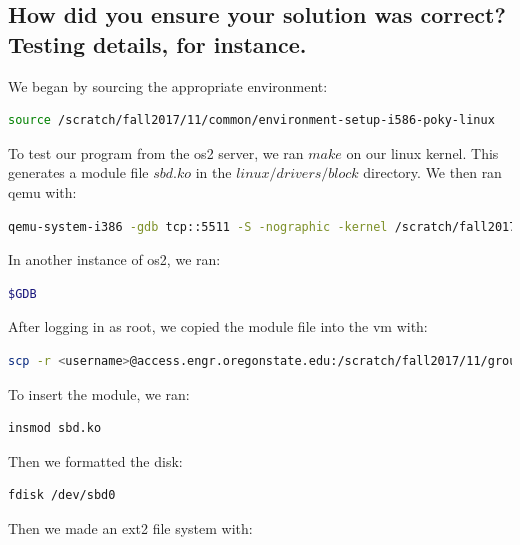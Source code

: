 \documentclass[letterpaper, onecolumn, draftclsnofoot, 10pt, compsoc]{IEEEtran}
\begin{document}
    \subsection{How did you ensure your solution was correct? Testing details, for instance.}
        \begin{singlespace}
        We began by sourcing the appropriate environment:
        
        \begin{lstlisting}[language=bash]
source /scratch/fall2017/11/common/environment-setup-i586-poky-linux
        \end{lstlisting}
        
        To test our program from the os2 server, we ran $make$ on our linux kernel. 
        This generates a module file $sbd.ko$ in the $linux/drivers/block$ directory. We then ran qemu with:
        \begin{lstlisting}[language=bash]
qemu-system-i386 -gdb tcp::5511 -S -nographic -kernel /scratch/fall2017/11/group11repo/linux/arch/x86/boot/bzImage -drive file=/scratch/fall2017/11/common/core-image-lsb-sdk-qemux86.ext4,if=virtio -enable-kvm -usb -localtime --no-reboot --append "root=/dev/vda rw console=ttyS0 debug"
        \end{lstlisting}
        In another instance of os2, we ran:
        \begin{lstlisting}[language=bash]
$GDB
        \end{lstlisting}
    
        After logging in as root, we copied the module file into the vm with:
        
        \begin{lstlisting}[language=bash]
scp -r <username>@access.engr.oregonstate.edu:/scratch/fall2017/11/group11repo/linux/drivers/block/sbd.ko .
        \end{lstlisting}
         
        To insert the module, we ran:
        
        \begin{lstlisting}[language=bash]
insmod sbd.ko
        \end{lstlisting}
        
        Then we formatted the disk:
        
        \begin{lstlisting}[language=bash]
fdisk /dev/sbd0
        \end{lstlisting}
        
        Then we made an ext2 file system with:
        

\end{singlespace}
\end{document}
